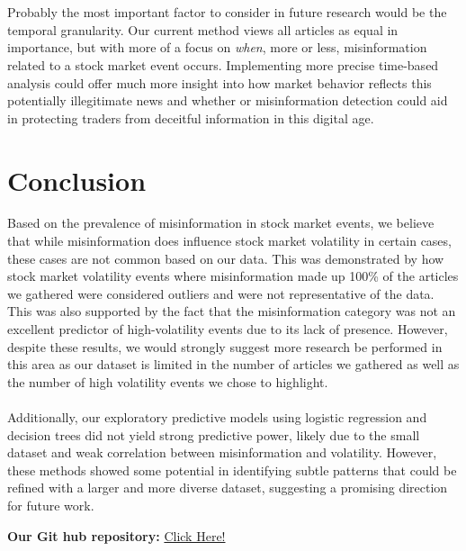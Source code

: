 \documentclass{article}
\begin{document}
\\\\
Probably the most important factor to consider in future research would be the temporal granularity. Our current method views all articles as equal in importance, but with more of a focus on \textit{when}, more or less, misinformation related to a stock market event occurs. Implementing more precise time-based analysis could offer much more insight into how market behavior reflects this potentially illegitimate news and whether or misinformation detection could aid in protecting traders from deceitful information in this digital age.

\section{Conclusion}

Based on the prevalence of misinformation in stock market events, we believe that while misinformation does influence stock market volatility in certain cases, these cases are not common based on our data. This was demonstrated by how stock market volatility events where misinformation made up 100\% of the articles we gathered were considered outliers and were not representative of the data. This was also supported by the fact that the misinformation category was not an excellent predictor of high-volatility events due to its lack of presence. However, despite these results, we would strongly suggest more research be performed in this area as our dataset is limited in the number of articles we gathered as well as the number of high volatility events we chose to highlight.   
\\\\
Additionally, our exploratory predictive models using logistic regression and decision trees did not yield strong predictive power, likely due to the small dataset and weak correlation between misinformation and volatility. However, these methods showed some potential in identifying subtle patterns that could be refined with a larger and more diverse dataset, suggesting a promising direction for future work.



\clearpage

\makebox[\linewidth]{\rule{20cm}{0.4pt}}
\textbf{Our Git hub repository:} \href{https://github.com/gcarrera109/DAT490Project/tree/main}{Click Here!}



\end{document}
